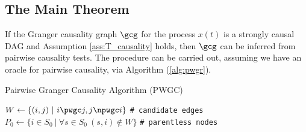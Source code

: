 \subsection{The Main Theorem}
\label{apx:proof_main_theorem}

\begin{theorem}
  \label{thm:scg_recovery}
  If the Granger causality graph $\gcg$ for the process $x(t)$ is a
  strongly causal DAG and Assumption \ref{ass:T_causality} holds, then
  $\gcg$ can be inferred from pairwise causality tests.  The procedure
  can be carried out, assuming we have an oracle for pairwise
  causality, via Algorithm (\ref{alg:pwgr}).
\end{theorem}

\begin{algorithm}[H]
  \DontPrintSemicolon

  \caption{Pairwise Granger Causality Algorithm (PWGC)}
  \label{alg:pwgr}
  \BlankLine
  $W \leftarrow \{(i, j)\ |\ i \pwgc j, j \npwgc i\}$  \texttt{\# candidate edges}\\
  $P_0 \leftarrow \{i \in S_0\ |\ \forall s \in S_0\ (s, i) \not\in W\}$  \texttt{\# parentless nodes}\\
\end{algorithm}

